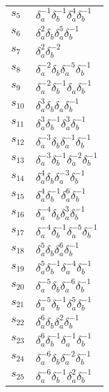 \documentclass{article}
\begin{document}
\begin{center}
\begin{tabular}{ll}
$s_{5}$ & $\delta_a^{-1}\delta_b^{-1}\delta_a^{4}\delta_b^{-1}$ \\
$s_{6}$ & $\delta_a^{2}\delta_b^{}\delta_a^{5}\delta_b^{-1}$ \\
$s_{7}$ & $\delta_a^{2}\delta_b^{-2}$ \\
$s_{8}$ & $\delta_a^{-2}\delta_b^{}\delta_a^{-5}\delta_b^{-1}$ \\
$s_{9}$ & $\delta_a^{-2}\delta_b^{-1}\delta_a^{}\delta_b^{-1}$ \\
$s_{10}$ & $\delta_a^{3}\delta_b^{}\delta_a^{}\delta_b^{-1}$ \\
$s_{11}$ & $\delta_a^{3}\delta_b^{-1}\delta_a^{3}\delta_b^{-1}$ \\
$s_{12}$ & $\delta_a^{-3}\delta_b^{}\delta_a^{-1}\delta_b^{-1}$ \\
$s_{13}$ & $\delta_a^{-3}\delta_b^{-1}\delta_a^{-2}\delta_b^{-1}$ \\
$s_{14}$ & $\delta_a^{4}\delta_b^{}\delta_a^{-3}\delta_b^{-1}$ \\
$s_{15}$ & $\delta_a^{4}\delta_b^{-1}\delta_a^{6}\delta_b^{-1}$ \\
$s_{16}$ & $\delta_a^{-4}\delta_b^{}\delta_a^{3}\delta_b^{-1}$ \\
$s_{17}$ & $\delta_a^{-4}\delta_b^{-1}\delta_a^{-5}\delta_b^{-1}$ \\
$s_{18}$ & $\delta_a^{5}\delta_b^{}\delta_a^{6}\delta_b^{-1}$ \\
$s_{19}$ & $\delta_a^{5}\delta_b^{-1}\delta_a^{-4}\delta_b^{-1}$ \\
$s_{20}$ & $\delta_a^{-5}\delta_b^{}\delta_a^{-6}\delta_b^{-1}$ \\
$s_{21}$ & $\delta_a^{-5}\delta_b^{-1}\delta_a^{5}\delta_b^{-1}$ \\
$s_{22}$ & $\delta_a^{6}\delta_b^{}\delta_a^{2}\delta_b^{-1}$ \\
$s_{23}$ & $\delta_a^{6}\delta_b^{-1}\delta_a^{-1}\delta_b^{-1}$ \\
$s_{24}$ & $\delta_a^{-6}\delta_b^{}\delta_a^{-2}\delta_b^{-1}$ \\
$s_{25}$ & $\delta_a^{-6}\delta_b^{-1}\delta_a^{2}\delta_b^{-1}$ \\
\bottomrule
\end{tabular}
\end{center}

\thispagestyle{empty}
\end{document}
